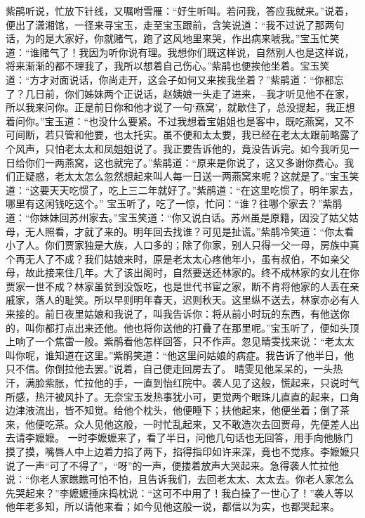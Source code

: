 \documentclass[12pt,oneside]{book}
\begin{document}
紫鹃听说，忙放下针线，又嘱咐雪雁：“好生听叫。若问我，答应我就来。”说着，便出了潇湘馆，一径来寻宝玉，走至宝玉跟前，含笑说道：“我不过说了那两句话，为的是大家好，你就赌气，跑了这风地里来哭，作出病来唬我。”宝玉忙笑道：“谁赌气了！我因为听你说有理。我想你们既这样说，自然别人也是这样说，将来渐渐的都不理我了，我所以想着自己伤心。”紫鹃也便挨他坐着。宝玉笑道：“方才对面说话，你尚走开，这会子如何又来挨我坐着？”紫鹃道：“你都忘了？几日前，你们姊妹两个正说话，赵姨娘一头走了进来，--我才听见他不在家，所以我来问你。正是前日你和他才说了一句‘燕窝’，就歇住了，总没提起，我正想着问你。”宝玉道：“也没什么要紧。不过我想着宝姐姐也是客中，既吃燕窝，又不可间断，若只管和他要，也太托实。虽不便和太太要，我已经在老太太跟前略露了个风声，只怕老太太和凤姐姐说了。我正要告诉他的，竟没告诉完。如今我听见一日给你们一两燕窝，这也就完了。”紫鹃道：“原来是你说了，这又多谢你费心。我们正疑惑，老太太怎么忽然想起来叫人每一日送一两燕窝来呢？这就是了。”宝玉笑道：“这要天天吃惯了，吃上三二年就好了。”紫鹃道：“在这里吃惯了，明年家去，哪里有这闲钱吃这个。”
宝玉听了，吃了一惊，忙问：“谁？往哪个家去？”紫鹃道：“你妹妹回苏州家去。”宝玉笑道：“你又说白话。苏州虽是原籍，因没了姑父姑母，无人照看，才就了来的。明年回去找谁？可见是扯谎。”紫鹃冷笑道：“你太看小了人。你们贾家独是大族，人口多的；除了你家，别人只得一父一母，房族中真个再无人了不成？我们姑娘来时，原是老太太心疼他年小，虽有叔伯，不如亲父母，故此接来住几年。大了该出阁时，自然要送还林家的。终不成林家的女儿在你贾家一世不成？林家虽贫到没饭吃，也是世代书宦之家，断不肯将他家的人丢在亲戚家，落人的耻笑。所以早则明年春天，迟则秋天。这里纵不送去，林家亦必有人来接的。前日夜里姑娘和我说了，叫我告诉你：将从前小时玩的东西，有他送你的，叫你都打点出来还他。他也将你送他的打叠了在那里呢。”宝玉听了，便如头顶上响了一个焦雷一般。紫鹃看他怎样回答，只不作声。忽见晴雯找来说：“老太太叫你呢，谁知道在这里。”紫鹃笑道：“他这里问姑娘的病症。我告诉了他半日，他只不信。你倒拉他去罢。”说着，自己便走回房去了。
晴雯见他呆呆的，一头热汗，满脸紫胀，忙拉他的手，一直到怡红院中。袭人见了这般，慌起来，只说时气所感，热汗被风扑了。无奈宝玉发热事犹小可，更觉两个眼珠儿直直的起来，口角边津液流出，皆不知觉。给他个枕头，他便睡下；扶他起来，他便坐着；倒了茶来，他便吃茶。众人见他这般，一时忙乱起来，又不敢造次去回贾母，先便差人出去请李嬷嬷。
一时李嬷嬷来了，看了半日，问他几句话也无回答，用手向他脉门摸了摸，嘴唇人中上边着力掐了两下，掐得指印如许来深，竟也不觉疼。李嬷嬷只说了一声“可了不得了”，“呀”的一声，便搂着放声大哭起来。急得袭人忙拉他说：“你老人家瞧瞧可怕不怕，且告诉我们，去回老太太、太太去。你老人家怎么先哭起来？”李嬷嬷捶床捣枕说：“这可不中用了！我白操了一世心了！”袭人等以他年老多知，所以请他来看；如今见他这般一说，都信以为实，也都哭起来。
\end{document}
